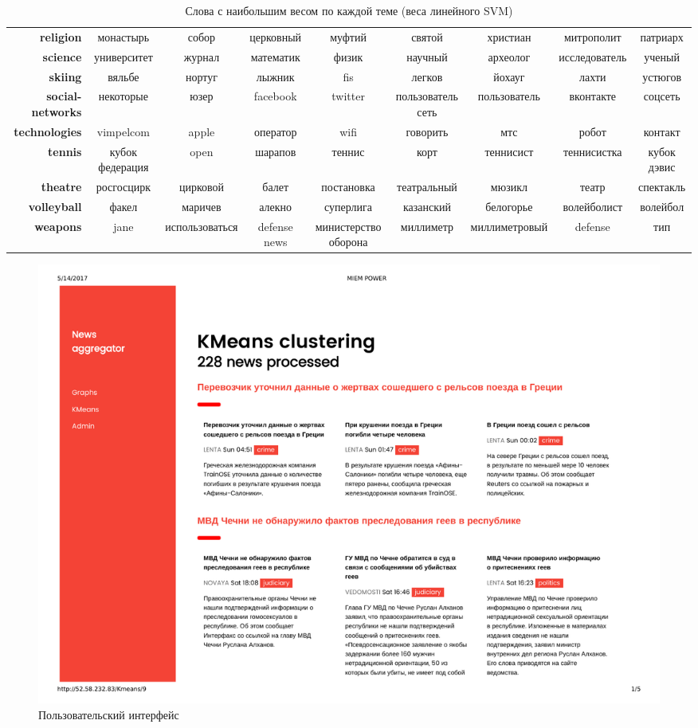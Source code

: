 \documentclass[a4paper, 14pt]{extarticle}
\begin{document}
\begin{table}[h]
{\begin{tabular}{r|cccccccc}
			\textbf{religion}        &          монастырь &           собор &          церковный &                муфтий &                святой &       христиан &       митрополит &        патриарх \\
			\textbf{science}         &        университет &          журнал &          математик &                 физик &               научный &       археолог &    исследователь &          ученый \\
			\textbf{skiing}          &             вяльбе &          нортуг &             лыжник &                   fis &                легков &         йохауг &            лахти &         устюгов \\
			\textbf{social-networks} &          некоторые &            юзер &           facebook &               twitter &     пользователь сеть &   пользователь &        вконтакте &         соцсеть \\
			\textbf{technologies}    &          vimpelcom &           apple &           оператор &                  wifi &              говорить &            мтс &            робот &         контакт \\
			\textbf{tennis}          &    кубок федерация &            open &            шарапов &                теннис &                  корт &      теннисист &      теннисистка &     кубок дэвис \\
			\textbf{theatre}         &         росгосцирк &        цирковой &              балет &            постановка &           театральный &         мюзикл &            театр &       спектакль \\
			\textbf{volleyball}      &              факел &         маричев &             алекно &             суперлига &             казанский &      белогорье &      волейболист &        волейбол \\
			\textbf{weapons}         &               jane &  использоваться &       defense news &  министерство оборона &             миллиметр &  миллиметровый &          defense &             тип \\
			\bottomrule
	\end{tabular}}
	\caption{Слова с наибольшим весом по каждой теме (веса линейного SVM)}
	\label{table:svm_topwords}
\end{table}

\begin{figure}[t!]
	\centering
	\includegraphics[width=1\textwidth]{228_news.pdf}
	\caption{Пользовательский интерфейс}
	\label{UI}
\end{figure}
\end{document}

